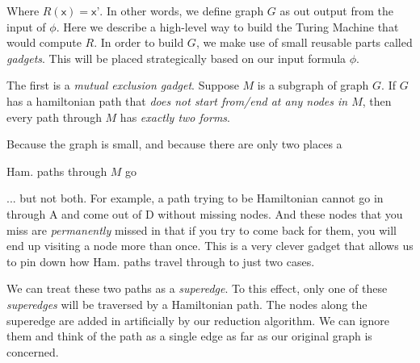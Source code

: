 Where $R(\textsf{x}) = \textsf{x'}$. In other words, 
we define graph $G$ as out output from the input of $\phi$. 
Here we describe a high-level way to build the Turing Machine that 
would compute $R$. In order to build $G$, we make use of 
small reusable parts called \textit{gadgets}. 
This will be placed strategically based on our input formula $\phi$. 


\frmrule

The first is a \textit{mutual exclusion gadget}.
Suppose $M$ is a subgraph of graph $G$. 
If $G$ has a hamiltonian path that \textit{does not start from/end at 
any nodes in $M$}, then every path through $M$ has \textit{exactly two forms}. 



Because the graph is small, and because there are only two places 
a 

Ham. paths through $M$ go 

... but not both. For example, a path trying to be Hamiltonian 
cannot go in through A and come out of D without missing nodes. 
And these nodes that you miss are \textit{permanently} 
missed in that if you try to come back for them, you will end 
up visiting a node more than once. This is a very clever 
gadget that allows us to pin down how Ham. paths travel through to just 
two cases.

We can treat these two paths as a \textit{superedge}. 
To this effect, only one of these \textit{superedges} will be traversed 
by a Hamiltonian path. The nodes along the superedge are added in artificially 
by our reduction algorithm. We can ignore them and think of the path as a 
single edge as far as our original 
graph is concerned. 

